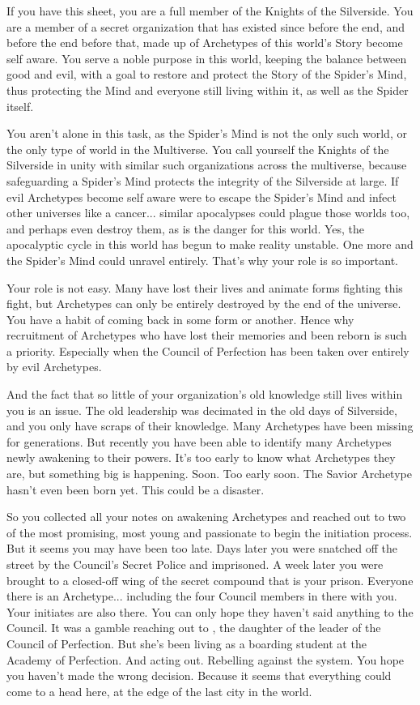 \documentclass[blue]{Silversiders}
\begin{document}
\name{\bKnights{}}

If you have this sheet, you are a full member of the Knights of the Silverside. You are a member of a secret organization that has existed since before the end, and before the end before that, made up of Archetypes of this world's Story become self aware. You serve a noble purpose in this world, keeping the balance between good and evil, with a goal to restore and protect the Story of the Spider's Mind, thus protecting the Mind and everyone still living within it, as well as the Spider itself. 

You aren't alone in this task, as the Spider's Mind is not the only such world, or the only type of world in the Multiverse. You call yourself the Knights of the Silverside in unity with similar such organizations across the multiverse, because safeguarding a Spider's Mind protects the integrity of the Silverside at large. If evil Archetypes become self aware were to escape the Spider's Mind and infect other universes like a cancer... similar apocalypses could plague those worlds too, and perhaps even destroy them, as is the danger for this world. Yes, the apocalyptic cycle in this world has begun to make reality unstable. One more and the Spider's Mind could unravel entirely. That's why your role is so important.

Your role is not easy. Many have lost their lives and animate forms fighting this fight, but Archetypes can only be entirely destroyed by the end of the universe. You have a habit of coming back in some form or another. Hence why recruitment of Archetypes who have lost their memories and been reborn is such a priority. Especially when the Council of Perfection has been taken over entirely by evil Archetypes.

And the fact that so little of your organization's old knowledge still lives within you is an issue. The old leadership was decimated in the old days of Silverside, and you only have scraps of their knowledge. Many Archetypes have been missing for generations. But recently you have been able to identify many Archetypes newly awakening to their powers. It's too early to know what Archetypes they are, but something big is happening. Soon. Too early soon. The Savior Archetype hasn't even been born yet. This could be a disaster.

So you collected all your notes on awakening Archetypes and reached out to two of the most promising, most young and passionate to begin the initiation process. But it seems you may have been too late. Days later you were snatched off the street by the Council's Secret Police and imprisoned. A week later you were brought to a closed-off wing of the secret compound that is your prison. Everyone there is an Archetype... including the four Council members in there with you. Your initiates are also there. You can only hope they haven't said anything to the Council. It was a gamble reaching out to \cTruth{}, the daughter of the leader of the Council of Perfection. But she's been living as a boarding student at the Academy of Perfection. And acting out. Rebelling against the system. You hope you haven't made the wrong decision. Because it seems that everything could come to a head here, at the edge of the last city in the world.
\end{document}
